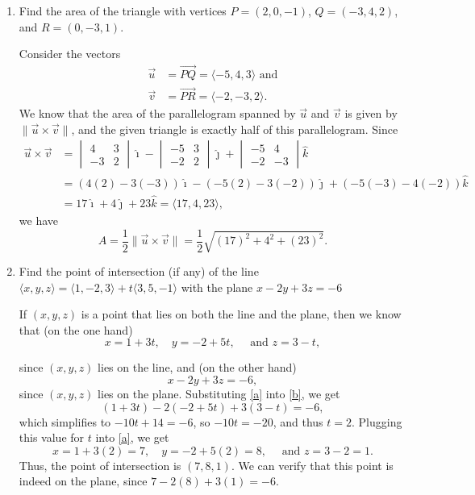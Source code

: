 \documentclass[12pt]{article}
\newcommand{\len}[1]{\lVert #1\rVert}
\newcommand{\bvm}{\begin{vmatrix}}
\newcommand{\evm}{\end{vmatrix}}
\begin{document}
 \begin{enumerate}
\item Find the area of the triangle with vertices $P=(2,0,-1)$, $Q=(-3,4,2)$, and $R=(0,-3,1)$.

\bigskip

Consider the vectors
\begin{align*}
 \vec{u} &= \overrightarrow{PQ}=\langle -5,4,3\rangle \text{ and}\\
 \vec{v} &= \overrightarrow{PR}=\langle -2,-3,2\rangle.
\end{align*}
We know that the area of the parallelogram spanned by $\vec{u}$ and $\vec{v}$ is given by $\len{\vec{u}\times\vec{v}}$, and the given triangle is exactly half of this parallelogram. Since
\begin{align*}
 \vec{u}\times\vec{v} &= \bvm 4&3\\-3&2\evm\hat{\imath}-\bvm -5&3\\-2&2\evm\hat{\jmath}+\bvm -5&4\\-2&-3\evm\hat{k}\\[3pt]
 & = (4(2)-3(-3))\hat{\imath}-(-5(2)-3(-2))\hat{\jmath}+(-5(-3)-4(-2))\hat{k}\\
 & = 17\hat{\imath}+4\hat{\jmath}+23\hat{k} = \langle 17,4,23\rangle,
\end{align*}
we have
\[
 A = \frac{1}{2}\len{\vec{u}\times\vec{v}}=\frac{1}{2}\sqrt{(17)^2+4^2+(23)^2}.
\]


 \item Find the point of intersection (if any) of the line $\langle x,y,z\rangle =  \langle 1, -2, 3\rangle+t\langle 3, 5, -1\rangle$ with the plane $x-2y+3z=-6$

\bigskip

If $(x,y,z)$ is a point that lies on both the line and the plane, then we know that (on the one hand)
\begin{equation}\label{a}
 x=1+3t, \quad y=-2+5t, \quad \text{ and } z=3-t,
\end{equation}

since $(x,y,z)$ lies on the line, and (on the other hand)
\begin{equation}\label{b}
 x-2y+3z=-6,
\end{equation}
since $(x,y,z)$ lies on the plane. Substituting \eqref{a} into \eqref{b}, we get
\[
 (1+3t)-2(-2+5t)+3(3-t)=-6,
\]
which simplifies to $-10t+14=-6$, so $-10t=-20$, and thus $t=2$. Plugging this value for $t$ into \eqref{a}, we get
\[
 x = 1+3(2) = 7,\quad y=-2+5(2) = 8, \quad \text{ and } z=3-2=1.
\]
Thus, the point of intersection is $(7,8,1)$. We can verify that this point is indeed on the plane, since $7-2(8)+3(1)=-6$.


\end{enumerate}
\end{document}
